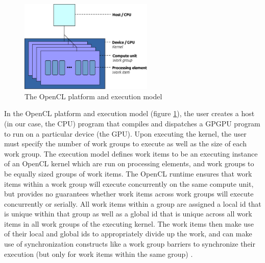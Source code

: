 \documentclass[conference,10pt]{IEEEtran}
\begin{document}
\begin{figure}[!t]
\centering
\includegraphics[width=2.5in]{resource/opencl_model.eps}
\caption{The OpenCL platform and execution model}
\label{fig:opencl}
\end{figure}

In the OpenCL platform and execution model (figure \ref{fig:opencl}), the user creates a host (in our case, 
the CPU) program that compiles and dispatches a GPGPU program to run on a particular device (the GPU).  
Upon executing the kernel, the user must specify the number of work groups to execute as well as the size 
of each work group.  The execution model defines work items to be an executing instance of an OpenCL kernel 
which are run on processing elements, and work groups to be equally sized groups of work items. The OpenCL 
runtime ensures that work items within a work group will execute concurrently on the same compute unit, but 
provides no guarantees whether work items across work groups will execute concurrently or serially. All 
work items within a group are assigned a local id that is unique within that group as well as a global id 
that is unique across all work items in all work groups of the executing kernel.  The work items then make 
use of their local and global ids to appropriately divide up the work, and can make use of synchronization 
constructs like a work group barriers to synchronize their execution (but only for work items within the 
same group) \cite{opencl_guide}.

%
%
\end{document}
